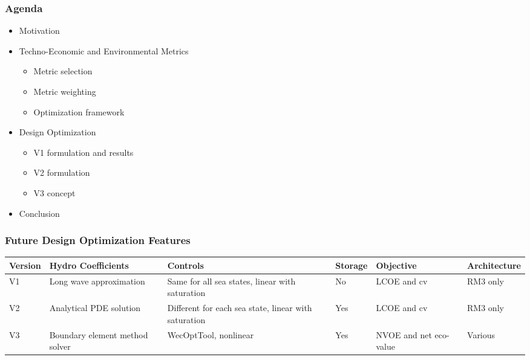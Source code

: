 \begin{frame}
	\frametitle{Agenda}
	\begin{itemize}
		\item Motivation
		\item Techno-Economic and Environmental Metrics
		      \begin{itemize}
		      	\item Metric selection
		      	\item Metric weighting
		      	\item Optimization framework
		      \end{itemize}
		\item Design Optimization
		      \begin{itemize}
		      	\item V1 formulation and results
		      	\item V2 formulation
		      	\item V3 concept
		      \end{itemize}
		\item Conclusion
	\end{itemize}
\end{frame}


\begin{frame}
	\frametitle{Future Design Optimization Features}
	\begin{tabular}{|l|l|l|l|l|l|} \hline
		Version & Hydro Coefficients             & Controls                                             & Storage & Objective              & Architecture \\ \hline
		V1      & Long wave approximation        & Same for all sea states, linear with saturation      & No      & LCOE and cv            & RM3 only     \\ \hline
		V2      & Analytical PDE solution        & Different for each sea state, linear with saturation & Yes     & LCOE and cv            & RM3 only     \\ \hline
		V3      & Boundary element method solver & WecOptTool, nonlinear                                & Yes     & NVOE and net eco-value & Various      \\ \hline
	\end{tabular}
	
	
\end{frame}


